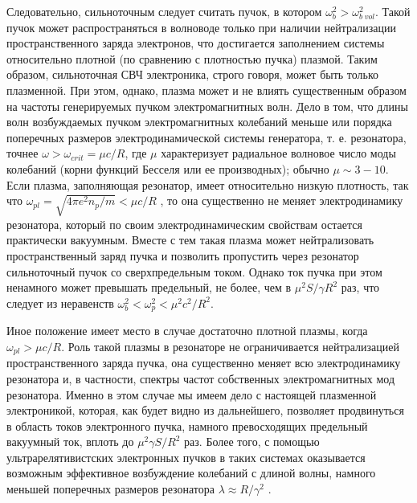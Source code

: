\documentclass[10pt, a4paper]{article}
\begin{document}
Следовательно, сильноточным следует считать пучок, в котором $\omega_{b}^{2}>\omega_{b\;vol}^{2}$. Такой пучок может распространяться в волноводе только при наличии нейтрализации пространственного заряда электронов, что достигается заполнением системы относительно плотной (по сравнению с плотностью пучка) плазмой. Таким образом, сильноточная СВЧ электроника, строго говоря, может быть только плазменной. При этом, однако, плазма может и не влиять существенным образом на частоты генерируемых пучком электромагнитных волн. Дело в том, что длины волн возбуждаемых пучком электромагнитных колебаний меньше или порядка поперечных размеров электродинамической системы генератора, т. е. резонатора, точнее $\omega>\omega_{crit}= \mu c/R$, где $\mu$ характеризует радиальное волновое число моды колебаний (корни функций Бесселя или ее производных); обычно $\mu \sim 3-10$. Если плазма, заполняющая резонатор, имеет относительно низкую плотность, так что $\omega_{pl}=\sqrt{4\pi e^{2} n_{p} /m} < \mu c/R$ , то она существенно не меняет электродинамику резонатора, который по своим электродинамическим свойствам остается практически вакуумным. Вместе с тем такая плазма может нейтрализовать пространственный заряд пучка и позволить пропустить через резонатор сильноточный пучок со сверхпредельным током. Однако ток пучка при этом ненамного может превышать предельный, не более, чем в $\mu^{2} S/\gamma R^{2}$ раз, что следует из неравенств $\omega_{b}^{2}<\omega_{p}^{2}<\mu^{2} c^{2}/R^{2}$.

Иное положение имеет место в случае достаточно плотной плазмы, когда $\omega_{pl}>\mu c/R$. Роль такой плазмы в резонаторе не ограничивается нейтрализацией пространственного заряда пучка, она существенно меняет всю электродинамику резонатора и, в частности, спектры частот собственных электромагнитных мод резонатора. Именно в этом случае мы имеем дело с настоящей плазменной электроникой, которая, как будет видно из дальнейшего, позволяет продвинуться в область токов электронного пучка, намного превосходящих предельный вакуумный ток, вплоть до $\mu^{2}\gamma S/R^{2}$ раз. Более того, с помощью ультрарелятивистских электронных пучков в таких системах оказывается возможным эффективное возбуждение колебаний с длиной волны, намного меньшей поперечных размеров резонатора $\lambda \approx R/\gamma^{2}$ .

\begin{figure}[h!]
\end{figure}
\end{document}

